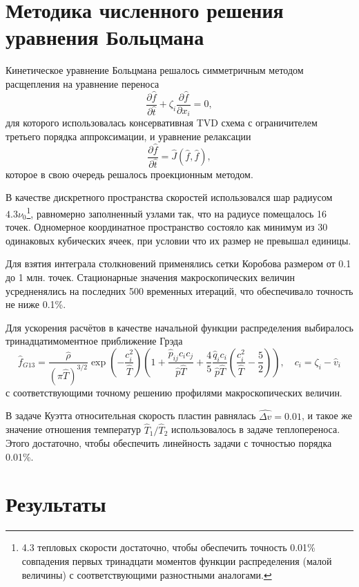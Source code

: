 \documentclass[a4paper,12pt]{article}
\begin{document}
\section{Методика численного решения уравнения Больцмана}

Кинетическое уравнение Больцмана решалось симметричным методом расщепления на уравнение переноса
\[ \frac{\partial\hat{f}}{\partial\hat{t}} + \zeta_i\frac{\partial\hat{f}}{\partial x_i} = 0, \]
для которого использовалась консервативная TVD схема с ограничителем третьего порядка аппроксимации,
и уравнение релаксации
\[ \frac{\partial\hat{f}}{\partial\hat{t}} = \hat{J}(\hat{f},\hat{f}), \]
которое в свою очередь решалось проекционным методом.

В качестве дискретного пространства скоростей использовался шар радиусом \(4.3\nu_0\)\footnote
{
    4.3 тепловых скорости достаточно, чтобы обеспечить точность 0.01\% совпадения
    первых тринадцати моментов функции распределения (малой величины) с соответствующими разностными аналогами.
},
равномерно заполненный узлами так, что на радиусе помещалось 16 точек.
Одномерное координатное пространство состояло как минимум из 30 одинаковых кубических ячеек,
при условии что их размер не превышал единицы.

Для взятия интеграла столкновений применялись сетки Коробова размером от 0.1 до 1 млн. точек.
Стационарные значения макроскопических величин усредненялись на последних 500 временных итераций,
что обеспечивало точность не ниже 0.1\%.

Для ускорения расчётов в качестве начальной функции распределения выбиралось тринадцатимоментное приближение Грэда
\[
    \hat{f}_{G13} = \frac{\hat\rho}{(\pi\hat T)^{3/2}}\exp\left(-\frac{c_i^2}{\hat T}\right)
    \left( 1+\frac{\hat p_{ij}c_ic_j}{\hat p\hat T} + \frac4{5}\frac{\hat q_ic_i}{\hat p\hat T}\left(\frac{c_i^2}{\hat T}-\frac5{2}\right) \right),
    \quad c_i = \zeta_i - \hat v_i
\]
с соответствующими точному решению профилями макроскопических величин.

В задаче Куэтта относительная скорость пластин равнялась \(\hat{\Delta{v}}=0.01\),
и такое же значение отношения температур \(\hat{T}_1/\hat{T}_2\) использовалось в задаче теплопереноса.
Этого достаточно, чтобы обеспечить линейность задачи с точностью порядка 0.01\%.

\section{Результаты}
\end{document}
